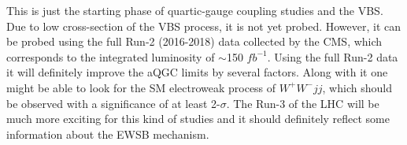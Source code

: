 This is just the starting phase of quartic-gauge coupling studies and the VBS. Due to low cross-section of the VBS process, it is not yet probed. However, it can be probed using the full Run-2 (2016-2018) data collected by the CMS, which corresponds to the integrated luminosity of $\sim$150 $fb^{-1}$. Using the full Run-2 data it will definitely improve the aQGC limits by several factors. Along with it one might be able to look for the SM electroweak process of $W^+W^-jj$, which should be observed with a significance of at least 2-$\sigma$. The Run-3 of the LHC will be much more exciting for this kind of studies and it should definitely reflect some information about the EWSB mechanism.




